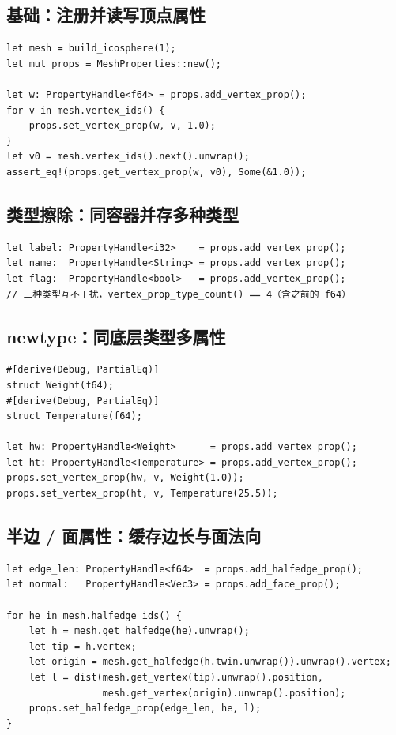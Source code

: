 \documentclass[11pt,a4paper]{article}
\begin{document}
\subsection{基础：注册并读写顶点属性}

\begin{lstlisting}
let mesh = build_icosphere(1);
let mut props = MeshProperties::new();

let w: PropertyHandle<f64> = props.add_vertex_prop();
for v in mesh.vertex_ids() {
    props.set_vertex_prop(w, v, 1.0);
}
let v0 = mesh.vertex_ids().next().unwrap();
assert_eq!(props.get_vertex_prop(w, v0), Some(&1.0));
\end{lstlisting}

\subsection{类型擦除：同容器并存多种类型}

\begin{lstlisting}
let label: PropertyHandle<i32>    = props.add_vertex_prop();
let name:  PropertyHandle<String> = props.add_vertex_prop();
let flag:  PropertyHandle<bool>   = props.add_vertex_prop();
// 三种类型互不干扰，vertex_prop_type_count() == 4（含之前的 f64）
\end{lstlisting}

\subsection{newtype：同底层类型多属性}

\begin{lstlisting}
#[derive(Debug, PartialEq)]
struct Weight(f64);
#[derive(Debug, PartialEq)]
struct Temperature(f64);

let hw: PropertyHandle<Weight>      = props.add_vertex_prop();
let ht: PropertyHandle<Temperature> = props.add_vertex_prop();
props.set_vertex_prop(hw, v, Weight(1.0));
props.set_vertex_prop(ht, v, Temperature(25.5));
\end{lstlisting}

\subsection{半边 / 面属性：缓存边长与面法向}

\begin{lstlisting}
let edge_len: PropertyHandle<f64>  = props.add_halfedge_prop();
let normal:   PropertyHandle<Vec3> = props.add_face_prop();

for he in mesh.halfedge_ids() {
    let h = mesh.get_halfedge(he).unwrap();
    let tip = h.vertex;
    let origin = mesh.get_halfedge(h.twin.unwrap()).unwrap().vertex;
    let l = dist(mesh.get_vertex(tip).unwrap().position,
                 mesh.get_vertex(origin).unwrap().position);
    props.set_halfedge_prop(edge_len, he, l);
}
\end{lstlisting}
\end{document}
